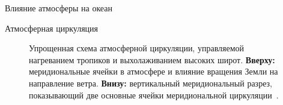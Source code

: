 \begin{chapter}{Влияние атмосферы на океан}
\begin{section}{Атмосферная циркуляция}
\begin{figure}[b!]
\vspace{-2ex}
\caption{Упрощенная схема атмосферной циркуляции, управляемой нагреванием 
тропиков и выхолаживанием высоких широт. 
\textbf{Вверху:} меридиональные ячейки в атмосфере и влияние вращения Земли на
направление ветра. 
\textbf{Внизу:} вертикальный меридиональный разрез, показывающий две основные 
ячейки меридиональной циркуляции~\cite[14]{OpenUniversity:1989a}.}
\label{fig:atmosphere}
\end{figure}
%


\end{section}
\end{chapter}
